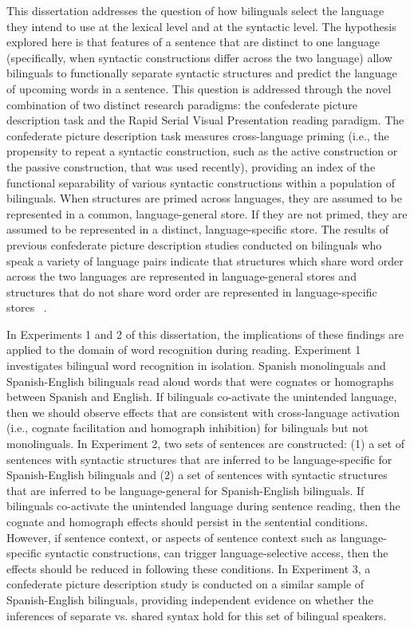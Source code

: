 This dissertation addresses the question of how bilinguals select the language they intend to use at the lexical level and at the syntactic level. The hypothesis explored here is that features of a sentence that are distinct to one language (specifically, when syntactic constructions differ across the two language) allow bilinguals to functionally separate syntactic structures and predict the language of upcoming words in a sentence. This question is addressed through the novel combination of two distinct research paradigms: the confederate picture description task and the Rapid Serial Visual Presentation reading paradigm. The confederate picture description task measures cross-language priming (i.e., the propensity to repeat a syntactic construction, such as the active construction or the passive construction, that was used recently), providing an index of the functional separability of various syntactic constructions within a population of bilinguals. When structures are primed across languages, they are assumed to be represented in a common, language-general store. If they are not primed, they are assumed to be represented in a distinct, language-specific store. The results of previous confederate picture description studies conducted on bilinguals who speak a variety of language pairs indicate that structures which share word order across the two languages are represented in language-general stores and structures that do not share word order are represented in language-specific stores ~\citep[e.g.,][]{Bernolet2007,Loebell2003}. 

In Experiments 1 and 2 of this dissertation, the implications of these findings are applied to the domain of word recognition during reading. Experiment 1 investigates bilingual word recognition in isolation. Spanish monolinguals and Spanish-English bilinguals read aloud words that were cognates or homographs between Spanish and English. If bilinguals co-activate the unintended language, then we should observe effects that are consistent with cross-language activation (i.e., cognate facilitation and homograph inhibition) for bilinguals but not monolinguals. In Experiment 2, two sets of sentences are constructed: (1) a set of sentences with syntactic structures that are inferred to be language-specific for Spanish-English bilinguals and (2) a set of sentences with syntactic structures that are inferred to be language-general for Spanish-English bilinguals. If bilinguals co-activate the unintended language during sentence reading, then the cognate and homograph effects should persist in the sentential conditions. However, if sentence context, or aspects of sentence context such as language-specific syntactic constructions, can trigger language-selective access, then the effects should be reduced in following these conditions. In Experiment 3, a confederate picture description study is conducted on a similar sample of Spanish-English bilinguals, providing independent evidence on whether the inferences of separate vs. shared syntax hold for this set of bilingual speakers. 

